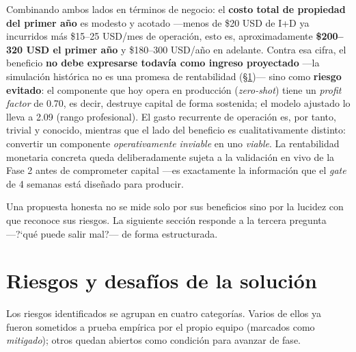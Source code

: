 \documentclass[11pt]{article}
\begin{document}
Combinando ambos lados en t\'erminos de negocio: el \textbf{costo total de propiedad del primer a\~no} es modesto y acotado ---menos de \$20 USD de I+D ya incurridos m\'as \$15--25 USD/mes de operaci\'on, esto es, aproximadamente \textbf{\$200--320 USD el primer a\~no} y \$180--300 USD/a\~no en adelante. Contra esa cifra, el beneficio \textbf{no debe expresarse todav\'ia como ingreso proyectado} ---la simulaci\'on hist\'orica no es una promesa de rentabilidad (\S\ref{sec:riesgos})--- sino como \textbf{riesgo evitado}: el componente que hoy opera en producci\'on (\textit{zero-shot}) tiene un \textit{profit factor} de 0.70, es decir, destruye capital de forma sostenida; el modelo ajustado lo lleva a 2.09 (rango profesional). El gasto recurrente de operaci\'on es, por tanto, trivial y conocido, mientras que el lado del beneficio es cualitativamente distinto: convertir un componente \emph{operativamente inviable} en uno \emph{viable}. La rentabilidad monetaria concreta queda deliberadamente sujeta a la validaci\'on en vivo de la Fase 2 antes de comprometer capital ---es exactamente la informaci\'on que el \textit{gate} de 4 semanas est\'a dise\~nado para producir.

Una propuesta honesta no se mide solo por sus beneficios sino por la lucidez con que reconoce sus riesgos. La siguiente secci\'on responde a la tercera pregunta ---?`qu\'e puede salir mal?--- de forma estructurada.

\section{Riesgos y desaf\'ios de la soluci\'on}
\label{sec:riesgos}

Los riesgos identificados se agrupan en cuatro categor\'ias. Varios de ellos ya fueron sometidos a prueba emp\'irica por el propio equipo (marcados como \textit{mitigado}); otros quedan abiertos como condici\'on para avanzar de fase.
\end{document}
